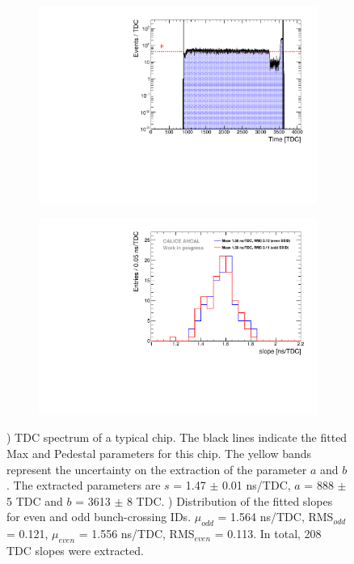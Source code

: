 \documentclass{JINST}
\begin{document}
\begin{figure}[htbp!]
	\begin{subfigure}[t]{0.49\textwidth}
		\centering
		\includegraphics[width=1\linewidth]{fig/ExampleTDCSpectra.pdf}
		\caption{} \label{fig:TDC_Spectrum}
	\end{subfigure}
	\hfill
	\begin{subfigure}[t]{0.49\textwidth}
		\centering
		\includegraphics[width=1\linewidth]{fig/SlopesTDC.pdf}
		\caption{} \label{fig:slopes}
	\end{subfigure}
	\caption{) TDC spectrum of a typical chip. The black lines indicate the fitted Max and Pedestal parameters for this chip. The yellow bands represent the uncertainty on the extraction of the parameter $a$ and $b$. The extracted parameters are $s$ = 1.47 $\pm$ 0.01 ns/TDC, $a$ = 888 $\pm$ 5 TDC and $b$ = 3613 $\pm$ 8 TDC. ) Distribution of the fitted slopes for even and odd bunch-crossing IDs. $\mu_{odd}$ = 1.564 ns/TDC, RMS$_{odd}$ = 0.121, $\mu_{even}$ = 1.556 ns/TDC, RMS$_{even}$ = 0.113. In total, 208 TDC slopes were extracted.}
\end{figure}
\end{document}
